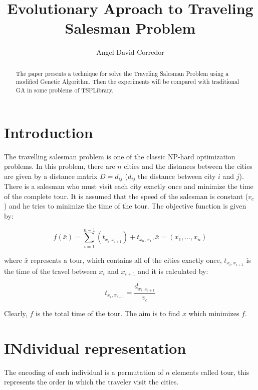 \documentclass[twocolumn]{IEEEtran}
\begin{document}
\title{Evolutionary Aproach to Traveling Salesman Problem}
\author{Angel David Corredor}
\date{}
\maketitle

\begin{abstract}
    The paper presents a technique for solve the Traveling Salesman Problem using a modified Genetic Algorithm.
    Then the experiments will be compared with traditional GA in some problems of TSPLibrary.     
\end{abstract}

\section{Introduction}

The travelling salesman problem is one of the classic NP-hard optimization problems.
In this problem, there are $n$ cities and the distances between the cities are given by a 
distance matrix $D=d_{ij}$ ($d_{ij}$ the distance between city $i$ and $j$).
There is a salesman who must visit each city exactly once and minimize the time of the complete tour.
It is assumed that the speed of the salesman is constant ($v_c$) and he tries to minimize
the time of the tour. 
The objective function is given by:

\begin{equation}
    f(\bar{x}) =
    \sum_{i=1}^{n-1} (t_{x_i,x_{i+1}})
    + t_{x_n,x_1},
    \bar{x}=(x_1,...,x_n)
\end{equation}

where $\bar{x}$ represents a tour, which contains all of the cities exactly once, 
$t_{x_i,x_{i+1}}$ is the time of the travel between $x_i$ and $x_{i+1}$ and it is calculated by:

\begin{equation}
    t_{x_i,x_{i+1}} =
    \frac{d_{x_i,x_{i+1}}}{v_c}
\end{equation}

Clearly, $f$ is the total time of the tour. The aim is to find $x$ which minimizes $f$. 

\section{INdividual representation}

The encoding of each individual is a permutation of $n$ elements called tour,
this represents the order in which the traveler visit the cities.
\end{document}
